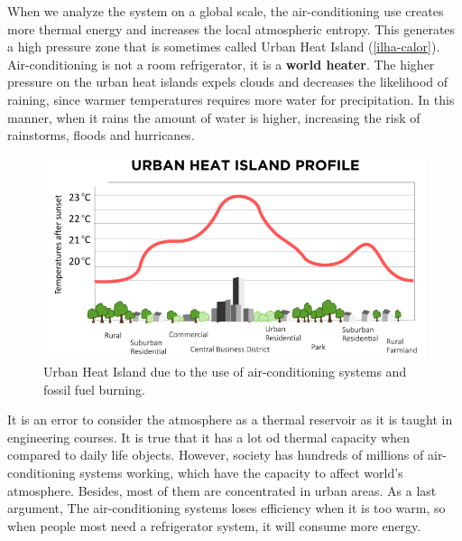 When we analyze the system on a global scale, the air-conditioning use creates more thermal energy and increases the local atmospheric entropy. This generates a high pressure zone that is sometimes called Urban Heat Island (\autoref{ilha-calor}). Air-conditioning is not a room refrigerator, it is a \textbf{world heater}. The higher pressure on the urban heat islands expels clouds and decreases the likelihood of raining, since warmer temperatures requires more water for precipitation. In this manner, when it rains the amount of water is higher, increasing the risk of rainstorms, floods and hurricanes.

\begin{figure}[ht]
    \centering
    \includegraphics[scale=0.5]{pictures/ilha-calor.png}
    \caption{Urban Heat Island due to the use of air-conditioning systems and fossil fuel burning.}
    \label{ilha-calor}
\end{figure}

It is an error to consider the atmosphere as a thermal reservoir as it is taught in engineering courses. It is true that it has a lot od thermal capacity when compared to daily life objects. However, society has hundreds of millions of air-conditioning systems working, which have the capacity to affect world's atmosphere. Besides, most of them are concentrated in urban areas. 
As a last argument, The air-conditioning systems loses efficiency when it is too warm, so when people most need a refrigerator system, it will consume more energy. 